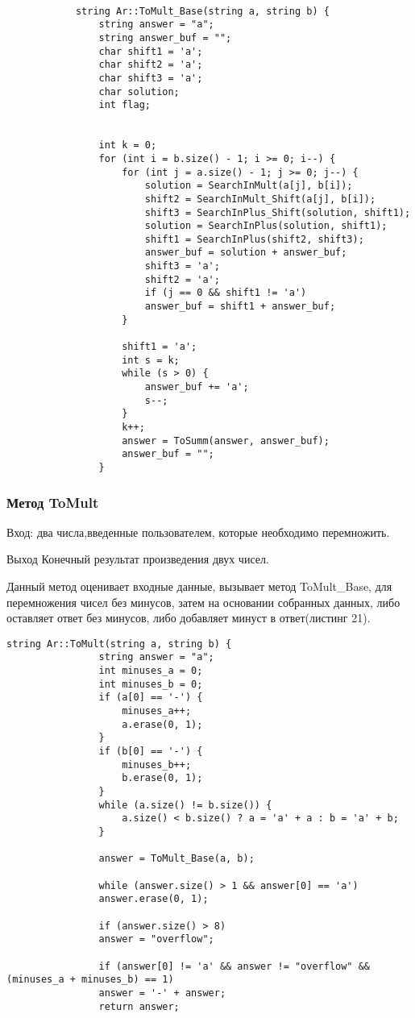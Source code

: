 \documentclass[10pt,a4paper,final]{article} %
\begin{document}
		
		\begin{lstlisting}[caption={Метод ToMult\_Base}]
			
			string Ar::ToMult_Base(string a, string b) {
				string answer = "a";
				string answer_buf = "";
				char shift1 = 'a';
				char shift2 = 'a';
				char shift3 = 'a';
				char solution;
				int flag;
				
				
				int k = 0;
				for (int i = b.size() - 1; i >= 0; i--) {
					for (int j = a.size() - 1; j >= 0; j--) {
						solution = SearchInMult(a[j], b[i]);
						shift2 = SearchInMult_Shift(a[j], b[i]);
						shift3 = SearchInPlus_Shift(solution, shift1);
						solution = SearchInPlus(solution, shift1);
						shift1 = SearchInPlus(shift2, shift3);
						answer_buf = solution + answer_buf;
						shift3 = 'a';
						shift2 = 'a';
						if (j == 0 && shift1 != 'a')
						answer_buf = shift1 + answer_buf;
					}
					
					shift1 = 'a';
					int s = k;
					while (s > 0) {
						answer_buf += 'a';
						s--;
					}
					k++;
					answer = ToSumm(answer, answer_buf);
					answer_buf = "";
				}
		\end{lstlisting}
		
		
				\subsubsection{Метод ToMult}
				Вход: два числа,введенные пользователем, которые необходимо перемножить.
				
				Выход Конечный результат произведения двух чисел.
				
				Данный метод оценивает входные данные, вызывает метод ToMult\_Base, для перемножения чисел без минусов, затем на основании собранных данных, либо оставляет ответ без минусов, либо добавляет минуст в ответ(листинг 21).
		
		\begin{lstlisting}[caption={Метод ToMult}]
			string Ar::ToMult(string a, string b) {
				string answer = "a";
				int minuses_a = 0;
				int minuses_b = 0;
				if (a[0] == '-') {
					minuses_a++;
					a.erase(0, 1);
				}
				if (b[0] == '-') {
					minuses_b++;
					b.erase(0, 1);
				}
				while (a.size() != b.size()) {
					a.size() < b.size() ? a = 'a' + a : b = 'a' + b;
				}
				
				answer = ToMult_Base(a, b);
				
				while (answer.size() > 1 && answer[0] == 'a')
				answer.erase(0, 1);
				
				if (answer.size() > 8)
				answer = "overflow";
				
				if (answer[0] != 'a' && answer != "overflow" && (minuses_a + minuses_b) == 1)
				answer = '-' + answer;
				return answer;
		\end{lstlisting}
		
\end{document}
